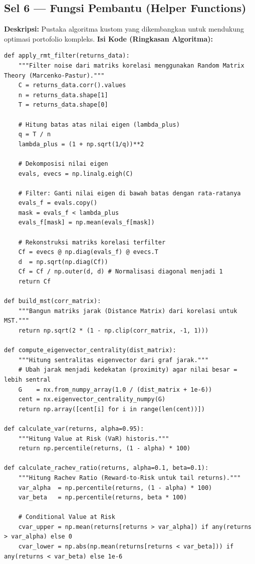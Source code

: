\documentclass[12pt, a4paper]{article}
\begin{document}
\subsection{Sel 6 — Fungsi Pembantu (Helper Functions)}
\textbf{Deskripsi:} Pustaka algoritma kustom yang dikembangkan untuk mendukung optimasi portofolio kompleks.
\textbf{Isi Kode (Ringkasan Algoritma):}
\begin{lstlisting}
def apply_rmt_filter(returns_data):
    """Filter noise dari matriks korelasi menggunakan Random Matrix Theory (Marcenko-Pastur)."""
    C = returns_data.corr().values
    n = returns_data.shape[1]
    T = returns_data.shape[0]
    
    # Hitung batas atas nilai eigen (lambda_plus)
    q = T / n
    lambda_plus = (1 + np.sqrt(1/q))**2
    
    # Dekomposisi nilai eigen
    evals, evecs = np.linalg.eigh(C)
    
    # Filter: Ganti nilai eigen di bawah batas dengan rata-ratanya
    evals_f = evals.copy()
    mask = evals_f < lambda_plus
    evals_f[mask] = np.mean(evals_f[mask])
    
    # Rekonstruksi matriks korelasi terfilter
    Cf = evecs @ np.diag(evals_f) @ evecs.T
    d  = np.sqrt(np.diag(Cf))
    Cf = Cf / np.outer(d, d) # Normalisasi diagonal menjadi 1
    return Cf

def build_mst(corr_matrix):
    """Bangun matriks jarak (Distance Matrix) dari korelasi untuk MST."""
    return np.sqrt(2 * (1 - np.clip(corr_matrix, -1, 1)))

def compute_eigenvector_centrality(dist_matrix):
    """Hitung sentralitas eigenvector dari graf jarak."""
    # Ubah jarak menjadi kedekatan (proximity) agar nilai besar = lebih sentral
    G    = nx.from_numpy_array(1.0 / (dist_matrix + 1e-6))
    cent = nx.eigenvector_centrality_numpy(G)
    return np.array([cent[i] for i in range(len(cent))])

def calculate_var(returns, alpha=0.95):
    """Hitung Value at Risk (VaR) historis."""
    return np.percentile(returns, (1 - alpha) * 100)

def calculate_rachev_ratio(returns, alpha=0.1, beta=0.1):
    """Hitung Rachev Ratio (Reward-to-Risk untuk tail returns)."""
    var_alpha  = np.percentile(returns, (1 - alpha) * 100)
    var_beta   = np.percentile(returns, beta * 100)
    
    # Conditional Value at Risk
    cvar_upper = np.mean(returns[returns > var_alpha]) if any(returns > var_alpha) else 0
    cvar_lower = np.abs(np.mean(returns[returns < var_beta])) if any(returns < var_beta) else 1e-6
    

\end{lstlisting}
\end{document}
